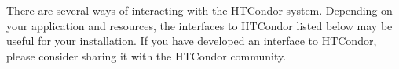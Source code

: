 There are several ways of interacting with the HTCondor system.  Depending on
your application and resources, the interfaces to HTCondor listed below may be
useful for your installation. If you have developed an interface to HTCondor,
please consider sharing it with the HTCondor community.









